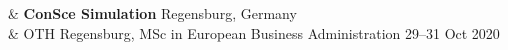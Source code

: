 %
{\color{gray}{Talks and tutorials}} 
& \textbf{ConSce Simulation} \hfill Regensburg, Germany \\
& OTH Regensburg, MSc in European Business Administration \hfill 29--31 Oct 2020 \\

